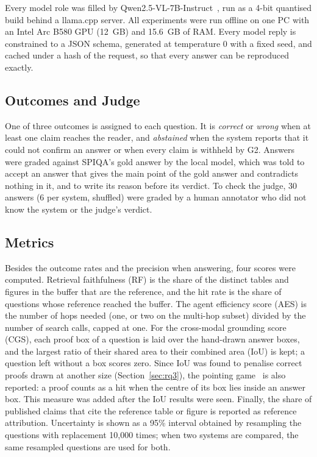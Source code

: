 Every model role was filled by Qwen2.5-VL-7B-Instruct~\cite{bai2025qwen25vl}, run as a
4-bit quantised build behind a llama.cpp server. All experiments were run offline on one
PC with an Intel Arc B580 GPU (12~GB) and 15.6~GB of RAM. Every model reply is
constrained to a JSON schema, generated at temperature 0 with a fixed seed, and cached
under a hash of the request, so that every answer can be reproduced exactly.

\subsection{Outcomes and Judge}

One of three outcomes is assigned to each question. It is \emph{correct} or
\emph{wrong} when at least one claim reaches the reader, and \emph{abstained} when the
system reports that it could not confirm an answer or when every claim is withheld by
G2. Answers were graded against SPIQA's gold answer by the local model, which was told
to accept an answer that gives the main point of the gold answer and contradicts
nothing in it, and to write its reason before its verdict. To check the judge, 30
answers (6 per system, shuffled) were graded by a human annotator who did not know the
system or the judge's verdict.

\subsection{Metrics}

Besides the outcome rates and the precision when answering, four scores were computed.
Retrieval faithfulness (RF) is the share of the distinct tables and figures in the
buffer that are the reference, and the hit rate is the share of questions whose
reference reached the buffer. The agent efficiency score (AES) is the number of hops
needed (one, or two on the multi-hop subset) divided by the number of search calls,
capped at one. For the cross-modal grounding score (CGS), each proof box of a question is
laid over the hand-drawn answer boxes, and the largest ratio of their shared area to
their combined area (IoU) is kept; a question left without a box scores zero. Since IoU was found to penalise correct proofs drawn at another size
(Section~\ref{sec:rq3}), the pointing game~\cite{zhang2018pointing} is also reported: a
proof counts as a hit when the centre of its box lies inside an answer box. This measure
was added after the IoU results were seen. Finally, the share of published claims that
cite the reference table or figure is reported as reference attribution. Uncertainty
is shown as a 95\% interval obtained by resampling the questions with replacement
10{,}000 times; when two systems are compared, the same resampled questions are used
for both.

